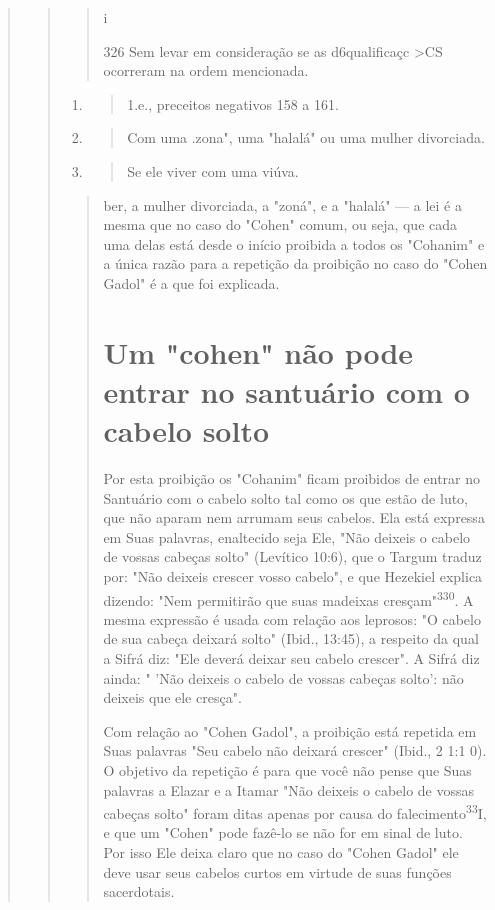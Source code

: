 \begin{quote}
\begin{quote}
\begin{quote}
i

326 Sem levar em consideração se as d6qualificaçc \textgreater CS
ocorreram na ordem mencionada.
\end{quote}

\begin{enumerate}
\def\labelenumi{\arabic{enumi}.}
\setcounter{enumi}{326}
\item
 \begin{quote}
 1.e., preceitos negativos 158 a 161.
 \end{quote}
\item
 \begin{quote}
 Com uma .zona", uma "halalá" ou uma mulher
 divorciada.
 \end{quote}
\item
 \begin{quote}
 Se ele viver com uma viúva.
 \end{quote}
\end{enumerate}

\begin{quote}ber, a mulher divorciada, a "zoná", e a "halalá" --- a lei é a mesma que
no caso do "Cohen" comum, ou seja, que cada uma delas está desde o
início proibida a todos os "Cohanim" e a única razão para a repetição da
proibição no caso do "Cohen Gadol" é a que foi explicada.

\section{Um "cohen" não pode entrar no santuário com o cabelo solto}

Por esta proibição os "Cohanim" ficam proibidos de entrar no San­tuário
com o cabelo solto tal como os que estão de luto, que não aparam nem
arrumam seus cabelos. Ela está expressa em Suas palavras, enaltecido
seja Ele, "Não deixeis o cabelo de vossas cabeças solto" (Levítico
10:6), que o Targum traduz por: "Não deixeis crescer vosso cabelo", e
que Hezekiel explica dizen­do: "Nem permitirão que suas madeixas
cresçam"\textsuperscript{330}. A mesma expressão é usada com relação aos
leprosos: "O cabelo de sua cabeça deixará solto" (Ibid., 13:45), a
respeito da qual a Sifrá diz: "Ele deverá deixar seu cabelo crescer". A
Sifrá diz ainda: " 'Não deixeis o cabelo de vossas cabeças solto': não
deixeis que ele cresça".

Com relação ao "Cohen Gadol", a proibição está repetida em Suas palavras
"Seu cabelo não deixará crescer" (Ibid., 2 1:1 0). O objetivo da
repeti­ção é para que você não pense que Suas palavras a Elazar e a
Itamar "Não dei­xeis o cabelo de vossas cabeças solto" foram ditas
apenas por causa do falecimento\textsuperscript{33}I, e que um "Cohen"
pode fazê-lo se não for em sinal de luto. Por isso Ele deixa claro que
no caso do "Cohen Gadol" ele deve usar seus ca­belos curtos em virtude
de suas funções sacerdotais.


\end{quote}
\end{quote}
\end{quote}
